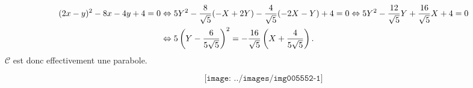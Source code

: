 {{\begin{align*}\ensuremath
(2x-y)^2-8x-4y+4=0&\Leftrightarrow5Y^2-\frac{8}{\sqrt{5}}(-X+2Y)-\frac{4}{\sqrt{5}}(-2X-Y)+4=0\Leftrightarrow5Y^2-\frac{12}{\sqrt{5}}Y+\frac{16}{\sqrt{5}}X+4=0\\
 &\Leftrightarrow5\left(Y-\frac{6}{5\sqrt{5}}\right)^2=-\frac{16}{\sqrt{5}}\left(X+\frac{4}{5\sqrt{5}}\right).
\end{align*}
$\mathcal{C}$ est donc effectivement une parabole.

$$\texttt{[image: ../images/img005552-1]}$$}
}